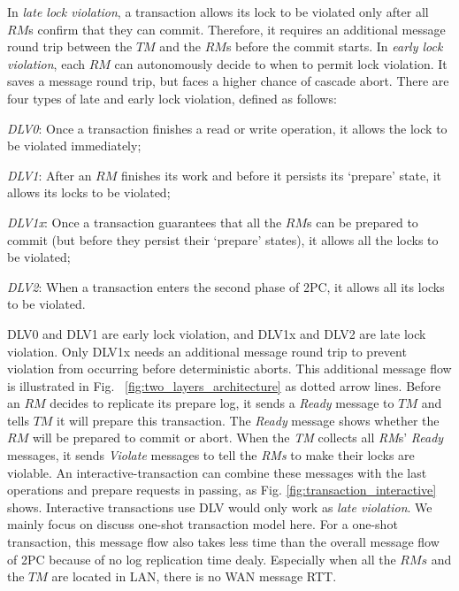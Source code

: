 \documentclass[conference]{IEEEtran}
\begin{document}
In \emph{late lock violation}, a transaction allows its lock to be violated only after all $RM$s confirm that they can commit.
Therefore, it requires an additional message round trip between the $TM$ and the $RM$s before the commit starts.
In \emph{early lock violation}, each $RM$ can autonomously decide to when to permit lock violation.
It saves a message round trip, but faces a higher chance of cascade abort.
There are four types of late and early lock violation, defined as follows:

\emph{DLV0}: Once a transaction finishes a read or write operation, it allows the lock to be violated immediately;

\emph{DLV1}: After an ${RM}$ finishes its work and before it persists its `prepare' state, it allows its locks to be violated;

\emph{DLV1x}: Once a transaction guarantees that all the ${RM}$s can be prepared to commit (but before they persist their `prepare' states), it allows all the locks to be violated;

\emph{DLV2}: When a transaction enters the second phase of 2PC, it allows all its locks to be violated.

DLV0 and DLV1 are early lock violation, and DLV1x and DLV2 are late lock violation.
Only DLV1x  needs an additional message round trip to prevent violation from occurring before deterministic aborts.
This additional message flow is illustrated in Fig. ~\ref{fig:two_layers_architecture} as dotted arrow lines.
Before an ${RM}$ decides to replicate its prepare log, it sends a \emph{Ready} message to ${TM}$ and tells ${TM}$ it will prepare this transaction.
The \emph{Ready} message shows whether the ${RM}$ will be prepared to commit or abort.
When the \emph{TM} collects all \emph{RM}s' \emph{Ready} messages, it sends \emph{Violate} messages to tell the \emph{RMs} to make their locks are violable.
An interactive-transaction can combine these messages with the last operations and prepare requests in passing, as Fig.   \ref{fig:transaction_interactive} shows.
Interactive transactions use DLV would only work as \emph{late violation}.
We mainly focus on discuss one-shot transaction model here.
For a one-shot transaction, this message flow also takes less time than the overall message flow of 2PC because of no log replication time dealy.
Especially when all the ${RMs}$ and the ${TM}$ are located in LAN, there is no WAN message RTT.
\end{document}
